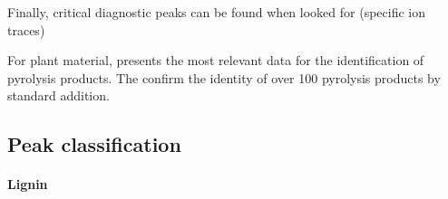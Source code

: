 Finally, critical diagnostic peaks can be found when looked for (specific ion traces)


For plant material, \cite{Ralph1991} presents the most relevant data for the identification of pyrolysis products. The confirm the identity of over 100 pyrolysis products by standard addition. 

\subsection{Peak classification}



\paragraph{Lignin}
